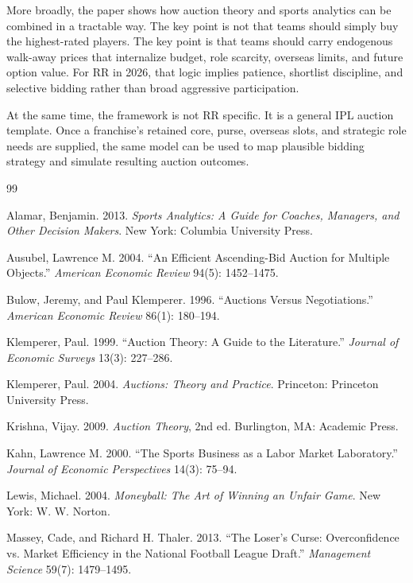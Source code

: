 \documentclass[11pt]{article}
\begin{document}
More broadly, the paper shows how auction theory and sports analytics can be combined in a tractable way. The key point is not that teams should simply buy the highest-rated players. The key point is that teams should carry endogenous walk-away prices that internalize budget, role scarcity, overseas limits, and future option value. For RR in 2026, that logic implies patience, shortlist discipline, and selective bidding rather than broad aggressive participation.

At the same time, the framework is not RR specific. It is a general IPL auction template. Once a franchise's retained core, purse, overseas slots, and strategic role needs are supplied, the same model can be used to map plausible bidding strategy and simulate resulting auction outcomes.

\begin{thebibliography}{99}

Alamar, Benjamin. 2013.
\textit{Sports Analytics: A Guide for Coaches, Managers, and Other Decision Makers}.
New York: Columbia University Press.

Ausubel, Lawrence M. 2004.
``An Efficient Ascending-Bid Auction for Multiple Objects.''
\textit{American Economic Review} 94(5): 1452--1475.

Bulow, Jeremy, and Paul Klemperer. 1996.
``Auctions Versus Negotiations.''
\textit{American Economic Review} 86(1): 180--194.

Klemperer, Paul. 1999.
``Auction Theory: A Guide to the Literature.''
\textit{Journal of Economic Surveys} 13(3): 227--286.

Klemperer, Paul. 2004.
\textit{Auctions: Theory and Practice}.
Princeton: Princeton University Press.

Krishna, Vijay. 2009.
\textit{Auction Theory}, 2nd ed.
Burlington, MA: Academic Press.

Kahn, Lawrence M. 2000.
``The Sports Business as a Labor Market Laboratory.''
\textit{Journal of Economic Perspectives} 14(3): 75--94.

Lewis, Michael. 2004.
\textit{Moneyball: The Art of Winning an Unfair Game}.
New York: W. W. Norton.

Massey, Cade, and Richard H. Thaler. 2013.
``The Loser's Curse: Overconfidence vs. Market Efficiency in the National Football League Draft.''
\textit{Management Science} 59(7): 1479--1495.


\end{thebibliography}
\end{document}
